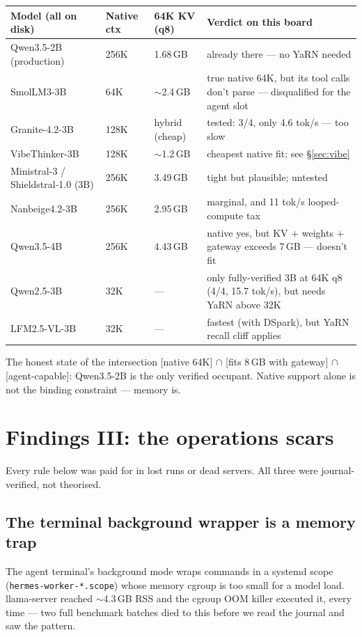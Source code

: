 \documentclass[11pt,a4paper]{article}
\begin{document}
\begin{center}
\small
\begin{tabularx}{\textwidth}{L{4.35cm} L{1.9cm} L{2.0cm} X}
\toprule
\textbf{Model (all on disk)} & \textbf{Native ctx} & \textbf{64K KV (q8)} & \textbf{Verdict on this board} \\
\midrule
Qwen3.5-2B (production) & 256K & 1.68\,GB & already there --- no YaRN needed \\
SmolLM3-3B & 64K & $\sim$2.4\,GB & true native 64K, but its tool calls don't parse --- disqualified for the agent slot \\
Granite-4.2-3B & 128K & hybrid (cheap) & tested: 3/4, only 4.6 tok/s --- too slow \\
VibeThinker-3B & 128K & $\sim$1.2\,GB & cheapest native fit; see \S\ref{sec:vibe} \\
Ministral-3 / Shieldstral-1.0 (3B) & 256K & 3.49\,GB & tight but plausible; untested \\
Nanbeige4.2-3B & 256K & 2.95\,GB & marginal, and 11 tok/s looped-compute tax \\
Qwen3.5-4B & 256K & 4.43\,GB & native yes, but KV + weights + gateway exceeds 7\,GB --- doesn't fit \\
Qwen2.5-3B & 32K & --- & only fully-verified 3B at 64K q8 (4/4, 15.7 tok/s), but needs YaRN above 32K \\
LFM2.5-VL-3B & 32K & --- & fastest (with DSpark), but YaRN recall cliff applies \\
\bottomrule
\end{tabularx}
\end{center}

The honest state of the intersection [native 64K] $\cap$ [fits 8\,GB with
gateway] $\cap$ [agent-capable]: Qwen3.5-2B is the only verified occupant.
Native support alone is not the binding constraint --- memory is.

\section{Findings III: the operations scars}

Every rule below was paid for in lost runs or dead servers. All three were
journal-verified, not theorised.

\subsection{The terminal background wrapper is a memory trap}

\begin{sloppypar}
The agent terminal's background mode wraps commands in a systemd scope
(\texttt{hermes-worker-*.scope}) whose memory cgroup is too small for a model
load. llama-server reached $\sim$4.3\,GB RSS and the cgroup OOM
killer executed it, every time --- two full benchmark batches died to this
before we read the journal and saw the pattern.
\end{sloppypar}
\end{document}

